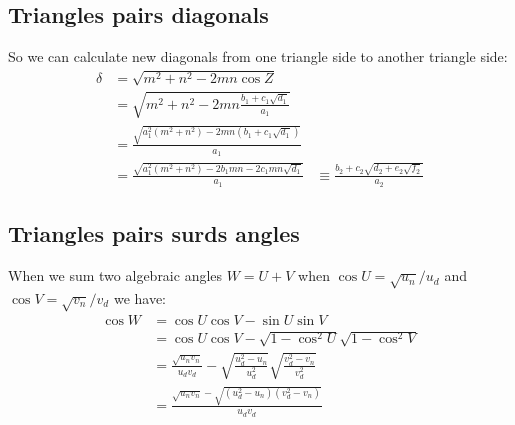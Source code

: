\documentclass[11pt]{article}
\begin{document}
\subsection{Triangles pairs diagonals}


So we can calculate new diagonals from one triangle side to another triangle side:
\begin{align}
\delta &= \sqrt{m^2 + n^2 - 2mn\cos{Z}}\\
 &= \sqrt{m^2 + n^2 - 2mn\frac{b_1+c_1\sqrt{d_1}}{a_1}}\\
 &= \frac{\sqrt{a_1^2(m^2 + n^2) - 2mn(b_1 + c_1\sqrt{d_1})}}{a_1}\\
 &= \frac{\sqrt{a_1^2(m^2 + n^2) - 2b_1mn - 2c_1mn\sqrt{d_1} }}{a_1} &\equiv \frac{b_2 + c_2\sqrt{d_2 + e_2\sqrt{f_2}}}{a_2}
\end{align}

\subsection{Triangles pairs surds angles}

When we sum two algebraic angles $W = U+V$ when $\cos{U} = \sqrt{u_n}/u_d$ and $\cos{V} = \sqrt{v_n}/v_d$ we have:
\begin{align}
\cos{W} &= \cos{U}\cos{V} - \sin{U}\sin{V}\\
 &= \cos{U}\cos{V} - \sqrt{1 - \cos^2{U}}\sqrt{1 - \cos^2{V}}\\
 &= \frac{\sqrt{u_nv_n}}{u_dv_d} - \sqrt{\frac{u_d^2 - u_n}{u_d^2}} \sqrt{\frac{v_d^2 - v_n}{v_d^2}}\\
 &= \frac{\sqrt{u_nv_n} - \sqrt{(u_d^2 - u_n)(v_d^2 - v_n)} }{u_dv_d}
\end{align}
\end{document}
